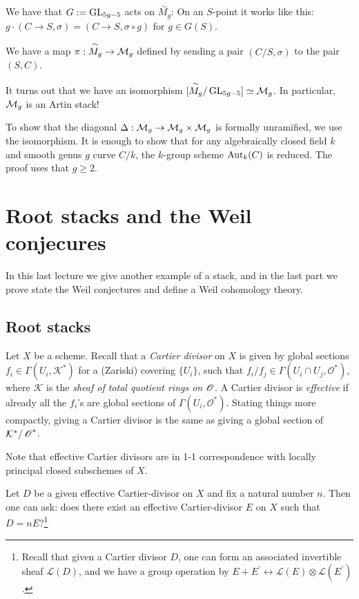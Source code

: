\documentclass[11pt, english]{article}
\begin{document}
We have that $G:=\operatorname{GL}_{5g-5}$ acts on $\overset{\sim}{M_g}$: On an $S$-point it works like this: $g \cdot (C \to S, \sigma) = (C \to S, \sigma \circ g)$ for $g \in G(S)$.

We have a map $\pi:\overset{\sim}{M_g} \to \mathcal{M}_g$ defined by sending a pair $(C/S, \sigma)$ to the pair $(S,C)$. 

It turns out that we have an isomorphism $[\overset{\sim}{M_g}/\operatorname{GL}_{5g-5}] \simeq \mathcal{M}_g$. In particular, $\mathcal{M}_g$ is an Artin stack!

To show that the diagonal $\Delta:\mathcal{M}_g \to \mathcal{M}_g \times \mathcal{M}_g$ is formally unramified, we use the isomorphism. It is enough to show that for any algebraically closed field $k$ and smooth genus $g$ curve $C/k$, the $k$-group scheme $\operatorname{Aut}_k(C)$ is reduced. The proof uses that $g \geq 2$.



\pagebreak
\section{Root stacks and the Weil conjecures}

In this last lecture we give another example of a stack, and in the last part we prove state the Weil conjectures and define a Weil cohomology theory.
\subsection{Root stacks}

Let $X$ be a scheme. Recall that a \emph{Cartier divisor} on $X$ is given by global sections $f_i \in \Gamma(U_i, \mathcal K^\ast)$ for a (Zariski) covering $\{U_i\}$, such that $f_i/f_j \in \Gamma(U_i \cap U_j, \mathcal O^\ast)$, where $\mathcal K$ is the \emph{sheaf of total quotient rings on $\operatorname{\mathscr{O}}$}. A Cartier divisor is \emph{effective} if already all the $f_i$'s are global sections of $\Gamma(U_i, \mathcal O^\ast)$. Stating things more compactly, giving a Cartier divisor is the same as giving a global section of $\mathcal K^\ast / \operatorname{\mathscr{O}}^\ast$.

Note that effective Cartier divisors are in 1-1 correspondence with locally principal closed subschemes of $X$.

Let $D$ be a given effective Cartier-divisor on $X$ and fix a natural number $n$. Then one can ask: does there exist an effective Cartier-divisor $E$ on $X$ such that $D = nE$?\footnote{ Recall that given a Cartier divisor $D$, one can form an associated invertible sheaf $\mathcal L(D)$, and we have a group operation by $E + E^\prime \leftrightarrow \mathcal L(E) \otimes \mathcal L(E^\prime)$.}
\end{document}
